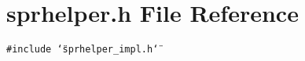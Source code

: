 \section{sprhelper.h File Reference}
\label{sprhelper_8h}
{\tt \#include \char`\"{}sprhelper\_\-impl.h\char`\"{}}\par
